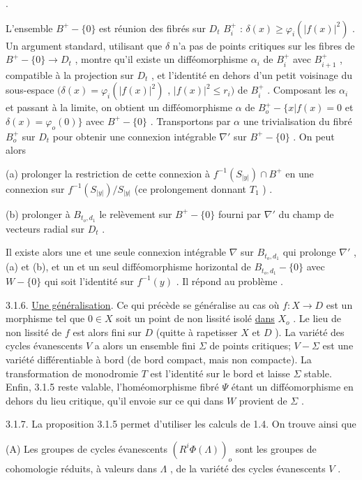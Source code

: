 .

L'ensemble $B^+ - \{0\}$ est réunion des fibrés sur $D_t$ $B_i^+$ : $\delta(x) \geq \varphi_i(|f(x)|^2)$ . Un argument standard, utilisant que $\delta$ n'a pas de points critiques sur les fibres de $B^+ - \{0\} \longrightarrow D_t$ , montre qu'il existe un difféomorphisme $\alpha_i$ de $B_i^+$ avec $B_{i+1}^+$ , compatible à la projection sur $D_t$ , et l'identité en dehors d'un petit voisinage du sous-espace
$(\delta(x) = \varphi_i(|f(x)|^2)$ , $|f(x)|^2 \leq r_i)$ de $B_i^+$ . Composant les $\alpha_i$ et passant à la limite, on obtient un difféomorphisme $\alpha$ de $B_o^+ - \{x | f(x) = 0$ et $\delta(x) = \varphi_o(0)\}$ avec $B^+ - \{0\}$ . Transportons par $\alpha$ une trivialisation du fibré $B_o^+$ sur $D_t$ pour obtenir une connexion intégrable $\nabla'$ sur $B^+ - \{0\}$ . On peut alors

(a) prolonger la restriction de cette connexion à $f^{-1}(S_{|y|}) \cap B^+$ en une connexion sur $f^{-1}(S_{|y|}) / S_{|y|}$ (ce prolongement donnant $T_1$ ) .

(b) prolonger à $B_{t_o,d_1}$ le relèvement sur $B^+ - \{0\}$ fourni par $\nabla'$ du champ de vecteurs radial sur $D_t$ .

Il existe alors une et une seule connexion intégrable $\nabla$ sur $B_{t_o,d_1}$ qui prolonge $\nabla'$ , (a) et (b), et un et un seul difféomorphisme horizontal de $B_{t_o,d_1} - \{0\}$ avec $W - \{0\}$ qui soit l'identité sur $f^{-1}(y)$ . Il répond au problème .

3.1.6. \underline{Une généralisation}. Ce qui précède se généralise au cas où $f : X \to D$ est un morphisme tel que $0 \in X$ soit un point de non lissité isolé \underline{dans} $X_o$ . Le lieu de non lissité de $f$ est alors fini sur $D$ (quitte à rapetisser $X$ et $D$ ). La variété des cycles évanescents $V$ a alors un ensemble fini $\Sigma$ de points critiques; $V - \Sigma$ est une variété différentiable à bord (de bord compact, mais non compacte). La transformation de monodromie $T$ est l'identité sur le bord et laisse $\Sigma$ stable. Enfin, 3.1.5 reste valable, l'homéomorphisme fibré $\Psi$ étant un difféomorphisme en dehors du lieu critique, qu'il envoie sur ce qui dans $W$ provient de $\Sigma$ .

3.1.7. La proposition 3.1.5 permet d'utiliser les calculs de 1.4. On trouve ainsi que

(A) Les groupes de cycles évanescents $(R^i \Phi(\Lambda))_o$ sont les groupes de cohomologie réduits, à valeurs dans $\Lambda$ , de la variété des cycles évanescents $V$ .

